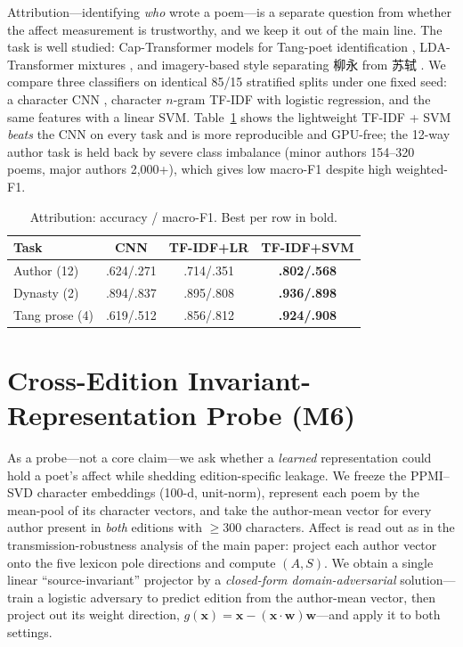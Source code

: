\documentclass[11pt]{article}
\begin{document}
\label{app:attr}
Attribution---identifying \emph{who} wrote a poem---is a separate question from whether
the affect measurement is trustworthy, and we keep it out of the main line. The task is
well studied: Cap-Transformer models for Tang-poet identification \citep{shiziren2022},
LDA-Transformer mixtures \citep{zhou2021lda}, and imagery-based style separating 柳永
from 苏轼 \citep{fang2011cld}. We compare three classifiers on identical 85/15
stratified splits under one fixed seed: a character CNN \citep{kim2014convolutional},
character $n$-gram TF-IDF with logistic regression, and the same features with a linear
SVM. Table~\ref{tab:attr} shows the lightweight TF-IDF + SVM \emph{beats} the CNN on
every task and is more reproducible and GPU-free; the 12-way author task is held back
by severe class imbalance (minor authors 154--320 poems, major authors 2{,}000+), which
gives low macro-F1 despite high weighted-F1.

\begin{table}[H]
\centering\footnotesize
\caption{Attribution: accuracy / macro-F1. Best per row in bold.}
\label{tab:attr}
\begin{tabular}{lccc}
\toprule
Task & CNN & TF-IDF+LR & TF-IDF+SVM\\
\midrule
Author (12) & .624/.271 & .714/.351 & \textbf{.802/.568}\\
Dynasty (2) & .894/.837 & .895/.808 & \textbf{.936/.898}\\
Tang prose (4) & .619/.512 & .856/.812 & \textbf{.924/.908}\\
\bottomrule
\end{tabular}
\end{table}

\section{Cross-Edition Invariant-Representation Probe (M6)}
\label{app:m6}
As a probe---not a core claim---we ask whether a \emph{learned} representation could
hold a poet's affect while shedding edition-specific leakage. We freeze the PPMI--SVD
character embeddings (100-d, unit-norm), represent each poem by the mean-pool of its
character vectors, and take the author-mean vector for every author present in
\emph{both} editions with $\ge$300 characters. Affect is read out as in
the transmission-robustness analysis of the main paper: project each author vector onto the five lexicon pole directions
and compute $(A,S)$. We obtain a single linear ``source-invariant'' projector by a
\emph{closed-form domain-adversarial} solution---train a logistic adversary to predict
edition from the author-mean vector, then project out its weight direction,
$g(\mathbf x)=\mathbf x-(\mathbf x\!\cdot\!\mathbf w)\mathbf w$---and apply it to both
settings.
\end{document}
